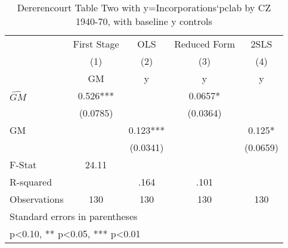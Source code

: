 \begin{table}[htbp]\centering
\def\sym#1{\ifmmode^{#1}\else\(^{#1}\)\fi}
\caption{Dererencourt Table Two with y=Incorporations`pclab by CZ 1940-70, with baseline y controls}
\begin{tabular}{l*{4}{c}}
\toprule
                    & First Stage   &         OLS   &Reduced Form   &        2SLS   \\
                    &\multicolumn{1}{c}{(1)}&\multicolumn{1}{c}{(2)}&\multicolumn{1}{c}{(3)}&\multicolumn{1}{c}{(4)}\\
                    &\multicolumn{1}{c}{GM}&\multicolumn{1}{c}{y}&\multicolumn{1}{c}{y}&\multicolumn{1}{c}{y}\\
\midrule
$\hat{GM}$          &       0.526***&               &      0.0657*  &               \\
                    &    (0.0785)   &               &    (0.0364)   &               \\
\addlinespace
GM                  &               &       0.123***&               &       0.125*  \\
                    &               &    (0.0341)   &               &    (0.0659)   \\
\midrule
F-Stat              &       24.11   &               &               &               \\
R-squared           &               &        .164   &        .101   &               \\
Observations        &         130   &         130   &         130   &         130   \\
\bottomrule
\multicolumn{5}{l}{\footnotesize Standard errors in parentheses}\\
\multicolumn{5}{l}{\footnotesize * p<0.10, ** p<0.05, *** p<0.01}\\
\end{tabular}
\end{table}
